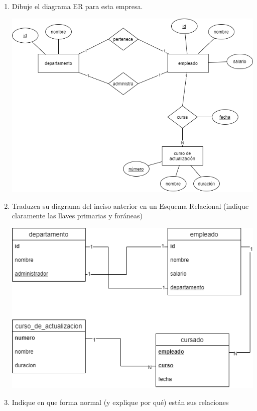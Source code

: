 \documentclass[]{article}
\begin{document}
    \begin{enumerate}
        \item Dibuje el diagrama ER para esta empresa.
        
        \begin{center}
            \includegraphics[scale=0.5]{er}
        \end{center}

        \item Traduzca su diagrama del inciso anterior en un Esquema Relacional (indique claramente las llaves
        primarias y foráneas)

        \begin{center}
            \includegraphics[scale=0.5]{relational}
        \end{center}

        \item Indique en que forma normal (y explique por qué) están sus relaciones
        

\end{enumerate}
\end{document}
